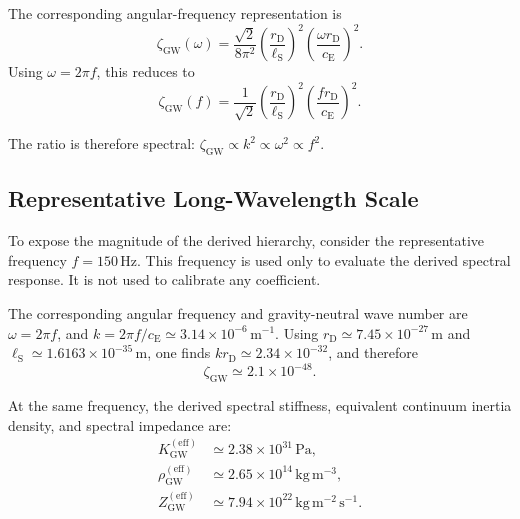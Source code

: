 The corresponding angular-frequency representation is
\begin{equation}
    \zeta_{\mathrm{GW}}(\omega) = \frac{\sqrt{2}}{8\pi^{2}} \left( \frac{r_{\mathrm{D}}}{\ell_{\mathrm{S}}} \right)^{2} \left( \frac{\omega r_{\mathrm{D}}}{c_{\mathrm{E}}} \right)^{2}.
    \label{eq:n7_zeta_omega}
\end{equation}
Using $\omega = 2\pi f$, this reduces to
\begin{equation}
    \zeta_{\mathrm{GW}}(f) = \frac{1}{\sqrt{2}} \left( \frac{r_{\mathrm{D}}}{\ell_{\mathrm{S}}} \right)^{2} \left( \frac{f r_{\mathrm{D}}}{c_{\mathrm{E}}} \right)^{2}.
    \label{eq:n7_zeta_f}
\end{equation}

The ratio is therefore spectral: $\zeta_{\mathrm{GW}} \propto k^{2} \propto \omega^{2} \propto f^{2}$.

\subsection{Representative Long-Wavelength Scale}
\label{subsec:n7_representative_scale}

To expose the magnitude of the derived hierarchy, consider the representative frequency $f = 150\,\mathrm{Hz}$. This frequency is used only to evaluate the derived spectral response. It is not used to calibrate any coefficient.

The corresponding angular frequency and gravity-neutral wave number are $\omega = 2\pi f$, and $k = 2\pi f/c_{\mathrm{E}} \simeq 3.14\times10^{-6}\,\mathrm{m^{-1}}$. Using $r_{\mathrm{D}} \simeq 7.45\times10^{-27}\,\mathrm{m}$ and $\ell_{\mathrm{S}} \simeq 1.6163\times10^{-35}\,\mathrm{m}$, one finds $kr_{\mathrm{D}} \simeq 2.34\times10^{-32}$, and therefore
\begin{equation}
    \zeta_{\mathrm{GW}} \simeq 2.1\times10^{-48}.
    \label{eq:n7_zeta_150hz}
\end{equation}

At the same frequency, the derived spectral stiffness, equivalent continuum inertia density, and spectral impedance are:
\begin{align}
    K_{\mathrm{GW}}^{(\mathrm{eff})} &\simeq 2.38\times10^{31}\,\mathrm{Pa}, \label{eq:n7_keff_150hz} \\
    \rho_{\mathrm{GW}}^{(\mathrm{eff})} &\simeq 2.65\times10^{14}\,\mathrm{kg\,m^{-3}}, \label{eq:n7_rhoeff_150hz} \\
    Z_{\mathrm{GW}}^{(\mathrm{eff})} &\simeq 7.94\times10^{22}\,\mathrm{kg\,m^{-2}\,s^{-1}}. \label{eq:n7_zeff_150hz}
\end{align}

